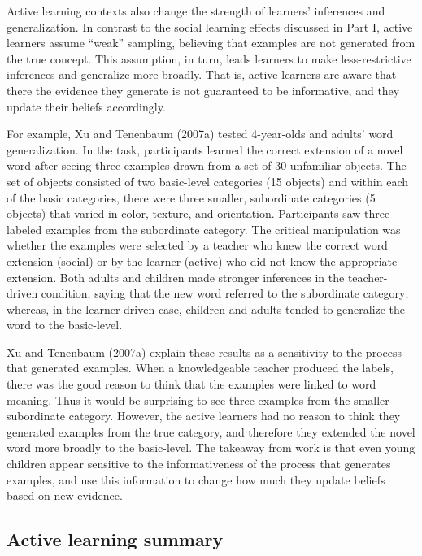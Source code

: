 \documentclass[english,floatsintext,man]{apa6}
\theoremstyle{definition}
\theoremstyle{definition}
\theoremstyle{definition}
\theoremstyle{remark}
\begin{document}
Active learning contexts also change the strength of learners'
inferences and generalization. In contrast to the social learning
effects discussed in Part I, active learners assume \enquote{weak}
sampling, believing that examples are not generated from the true
concept. This assumption, in turn, leads learners to make
less-restrictive inferences and generalize more broadly. That is, active
learners are aware that there the evidence they generate is not
guaranteed to be informative, and they update their beliefs accordingly.

For example, Xu and Tenenbaum (2007a) tested 4-year-olds and adults'
word generalization. In the task, participants learned the correct
extension of a novel word after seeing three examples drawn from a set
of 30 unfamiliar objects. The set of objects consisted of two
basic-level categories (15 objects) and within each of the basic
categories, there were three smaller, subordinate categories (5 objects)
that varied in color, texture, and orientation. Participants saw three
labeled examples from the subordinate category. The critical
manipulation was whether the examples were selected by a teacher who
knew the correct word extension (social) or by the learner (active) who
did not know the appropriate extension. Both adults and children made
stronger inferences in the teacher-driven condition, saying that the new
word referred to the subordinate category; whereas, in the
learner-driven case, children and adults tended to generalize the word
to the basic-level.

Xu and Tenenbaum (2007a) explain these results as a sensitivity to the
process that generated examples. When a knowledgeable teacher produced
the labels, there was the good reason to think that the examples were
linked to word meaning. Thus it would be surprising to see three
examples from the smaller subordinate category. However, the active
learners had no reason to think they generated examples from the true
category, and therefore they extended the novel word more broadly to the
basic-level. The takeaway from work is that even young children appear
sensitive to the informativeness of the process that generates examples,
and use this information to change how much they update beliefs based on
new evidence.

\subsection{Active learning summary}\label{active-learning-summary}
\end{document}
